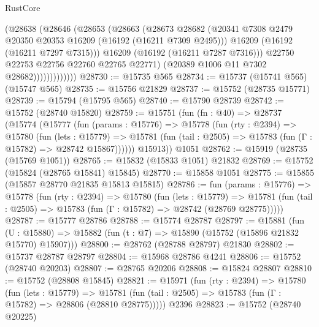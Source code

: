 \begin{lexlean}{RustCore}
\begin{coremodule}
                        (@28638
                          (@28646
                            (@28653
                              (@28663
                                (@28673
                                  @28682
                                  (@20341
                                    @7308
                                    @2479
                                    @20350
                                    @20353
                                    @16209
                                    (@16192 (@16211 @7309 @2495)))
                                  @16209
                                  (@16192 (@16211 @7297 @7315)))
                                @16209
                                (@16192 (@16211 @7287 @7316)))
                              @22750
                              @22753
                              @22756
                              @22760
                              @22765
                              @22771)
                            (@20389 @1006 @11 @7302 @28682)))))))))))))
@28730 := @15735 @565
@28734 := @15737 (@15741 @565) (@15747 @565)
@28735 := @15756 @21829
@28737 := @15752 (@28735 @15771)
@28739 := @15794 (@15795 @565)
@28740 := @15790 @28739
@28742 := @15752 (@28740 @15820)
@28759 := @15751
    (fun (fn : @40) =>
    @28737
      (@15774
        (@15777
          (fun (params : @15776) =>
          @15778
            (fun (rty : @2394) =>
            @15780
              (fun (lets : @15779) =>
              @15781 (fun (tail : @2505) => @15783 (fun (Γ : @15782) => @28742 @15867))))))
        @15913))
    @1051
@28762 := @15919 (@28735 (@15769 @1051))
@28765 := @15832 (@15833 @1051) @21832
@28769 := @15752 (@15824 (@28765 @15841) @15845)
@28770 := @15858 @1051
@28775 := @15855 (@15857 @28770 @21835 @15813 @15815)
@28786 := fun (params : @15776) =>
  @15778
    (fun (rty : @2394) =>
    @15780
      (fun (lets : @15779) =>
      @15781 (fun (tail : @2505) => @15783 (fun (Γ : @15782) => @28742 (@28769 @28775)))))
@28787 := @15777 @28786
@28788 := @15774 @28787
@28797 := @15881
    (fun (U : @15880) => @15882 (fun (t : @7) => @15890 (@15752 (@15896 @21832 @15770) @15907)))
@28800 := @28762 (@28788 @28797) @21830
@28802 := @15737 @28787 @28797
@28804 := @15968 @28786 @4241
@28806 := @15752 (@28740 @20203)
@28807 := @28765 @20206
@28808 := @15824 @28807
@28810 := @15752 (@28808 @15845)
@28821 := @15971
    (fun (rty : @2394) =>
    @15780
      (fun (lets : @15779) =>
      @15781 (fun (tail : @2505) => @15783 (fun (Γ : @15782) => @28806 (@28810 @28775)))))
    @2396
@28823 := @15752 (@28740 @20225)

\end{coremodule}
\end{lexlean}
